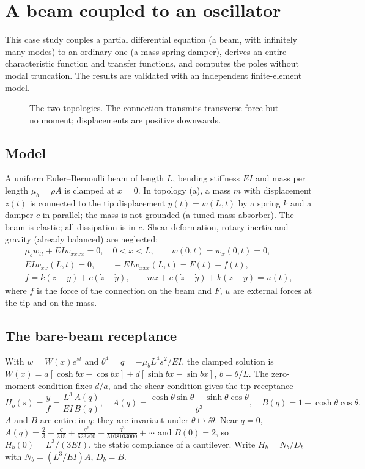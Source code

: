 \chapter{A beam coupled to an oscillator}\label{ch:beam}

This case study couples a partial differential equation (a beam, with
infinitely many modes) to an ordinary one (a mass-spring-damper), derives an
entire characteristic function and transfer functions, and computes the
poles without modal truncation. The results are validated with an
independent finite-element model.

\begin{figure}[H]
\centering

\caption{The two topologies. The connection transmits transverse force but
no moment; displacements are positive downwards.}
\label{fig:schematic}
\end{figure}

\section{Model}

A uniform Euler--Bernoulli beam of length $L$, bending stiffness $EI$ and
mass per length $\mu_b=\rho A$ is clamped at $x=0$. In topology (a), a mass
$m$ with displacement $z(t)$ is connected to the tip displacement
$y(t)=w(L,t)$ by a spring $k$ and a damper $c$ in parallel; the mass is not
grounded (a tuned-mass absorber). The beam is elastic; all dissipation is in
$c$. Shear deformation, rotary inertia and gravity (already balanced) are
neglected:
\begin{gather}
  \mu_bw_{tt}+EIw_{xxxx}=0,\quad 0<x<L,\qquad w(0,t)=w_x(0,t)=0,\\
  EIw_{xx}(L,t)=0,\qquad -EIw_{xxx}(L,t)=F(t)+f(t),\\
  f=k(z-y)+c(\dot z-\dot y),\qquad m\ddot z+c(\dot z-\dot y)+k(z-y)=u(t),
\end{gather}
where $f$ is the force of the connection on the beam and $F$, $u$ are
external forces at the tip and on the mass.

\section{The bare-beam receptance}

With $w=W(x)e^{st}$ and $\theta^4=q=-\mu_bL^4s^2/EI$, the clamped solution
is $W(x)=a[\cosh bx-\cos bx]+d[\sinh bx-\sin bx]$, $b=\theta/L$. The
zero-moment condition fixes $d/a$, and the shear condition gives the tip
receptance
\[
  H_b(s)=\frac{y}{f}=\frac{L^3}{EI}\frac{A(q)}{B(q)},\quad
  A(q)=\frac{\cosh\theta\sin\theta-\sinh\theta\cos\theta}{\theta^3},\quad
  B(q)=1+\cosh\theta\cos\theta .
\]
$A$ and $B$ are entire in $q$: they are invariant under $\theta\mapsto\ii\theta$.
Near $q=0$, $A(q)=\tfrac23-\tfrac q{315}+\tfrac{q^2}{623700}-\tfrac{q^3}{5108103000}+\cdots$
and $B(0)=2$, so $H_b(0)=L^3/(3EI)$, the static compliance of a cantilever.
Write $H_b=N_b/D_b$ with $N_b=(L^3/EI)A$, $D_b=B$.

